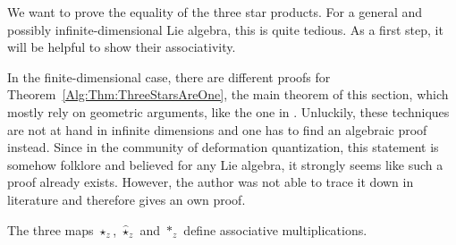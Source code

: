 We want to prove the equality of the three star products. For a general and 
possibly infinite-dimensional Lie algebra, this is quite tedious. As a first 
step, it will be helpful to show their associativity.
\begin{remark}
	In the finite-dimensional case, there are different proofs for 
	Theorem~\ref{Alg:Thm:ThreeStarsAreOne}, the main theorem of this section, 
	which mostly rely on geometric arguments, like the one in 
	\cite{bordemann.neumaier.waldmann:1999a}. Unluckily, these techniques are 
	not at hand in infinite dimensions and one has to find an algebraic proof 
	instead. Since in the community of deformation quantization, this 
	statement is somehow folklore and believed for any Lie algebra, it 
	strongly seems like such a proof already exists. However, the author was 
	not able to trace it down in literature and therefore gives an own proof.
\end{remark}
\begin{proposition}
	\label{Alg:Lemma:Associtivity}
	The three maps $\star_z$, $\widehat{\star}_z$ and $\ast_z$ define
	associative multiplications.
\end{proposition}
